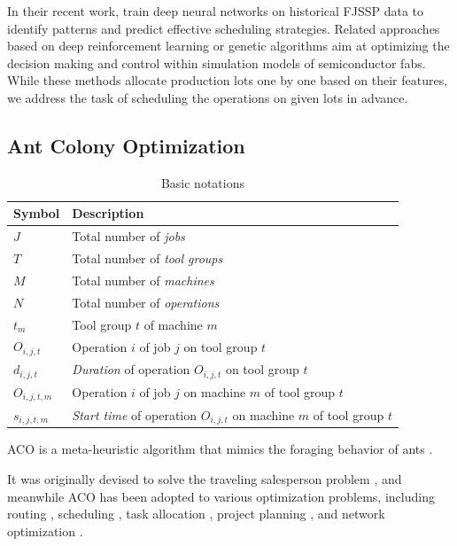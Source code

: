 \documentclass[runningheads]{llncs}
\begin{document}
In their recent work, \cite{shang2023study} 
train deep neural networks on historical FJSSP data to identify patterns and predict effective scheduling strategies.
Related approaches based on deep reinforcement learning \cite{stockermann2023dispatching,tassel2023semiconductor} or
genetic algorithms \cite{kovacs2023optimizing} aim at
optimizing the decision making and control within simulation models of semiconductor fabs.
While these methods allocate production lots one by one based on their features,
we address the task of scheduling the operations on given lots in advance.


\subsection{Ant Colony Optimization}
\label{sec:aco}

\begin{table}[t]
\caption{Basic notations}\label{notations} \centering
\begin{tabular}{ll}
	\hline
	Symbol & Description \\ \hline
	$J$ & Total number of \emph{jobs}        \\
	$T$ & Total number of \emph{tool groups} \\
	$M$ & Total number of \emph{machines}    \\
	$N$ & Total number of \emph{operations} \\
	$t_{m}$ & Tool group $t$ of machine $m$ \\
	$O_{i,j,t}$ & Operation $i$ of job $j$ on tool group $t$  \\
	$d_{i,j,t}$ & \emph{Duration} of operation $O_{i,j,t}$ on tool group $t$ \\
	$O_{i,j,t,m}$ & Operation $i$ of job $j$ on machine $m$ of tool group $t$  \\
	$s_{i,j,t,m}$ & \emph{Start time} of operation $O_{i,j,t}$ on machine $m$ of tool group $t$  \\
	\hline
\end{tabular}
\end{table}

ACO is a
meta-heuristic algorithm that mimics the foraging behavior of ants \cite{dorigo2019ant}.

It was originally devised to solve the traveling salesperson problem \cite{stutzle1999aco},
and meanwhile ACO has been adopted to various optimization problems, including routing \cite{rizzoli2007ant}, scheduling \cite{luo2008ant}, task allocation \cite{rugwiro2019task}, project planning \cite{khelifa2020holonic}, and network optimization \cite{wang2009hopnet}.
\end{document}
